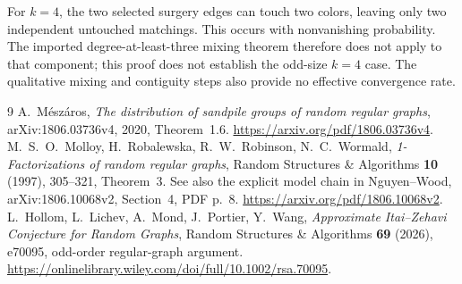 \documentclass[11pt]{article}
\begin{document}
For $k=4$, the two selected surgery edges can touch two colors, leaving only two independent untouched matchings. This occurs with nonvanishing probability. The imported degree-at-least-three mixing theorem therefore does not apply to that component; this proof does not establish the odd-size $k=4$ case. The qualitative mixing and contiguity steps also provide no effective convergence rate.

\begin{thebibliography}{9}
 A.~M\'esz\'aros, \emph{The distribution of sandpile groups of random regular graphs}, arXiv:1806.03736v4, 2020, Theorem~1.6.
\url{https://arxiv.org/pdf/1806.03736v4}.
 M.~S.~O.~Molloy, H.~Robalewska, R.~W.~Robinson, N.~C.~Wormald, \emph{1-Factorizations of random regular graphs}, Random Structures \& Algorithms \textbf{10} (1997), 305--321, Theorem~3. See also the explicit model chain in Nguyen--Wood, arXiv:1806.10068v2, Section~4, PDF p.~8.
\url{https://arxiv.org/pdf/1806.10068v2}.
 L.~Hollom, L.~Lichev, A.~Mond, J.~Portier, Y.~Wang, \emph{Approximate Itai--Zehavi Conjecture for Random Graphs}, Random Structures \& Algorithms \textbf{69} (2026), e70095, odd-order regular-graph argument.
\url{https://onlinelibrary.wiley.com/doi/full/10.1002/rsa.70095}.
\end{thebibliography}
\end{document}
